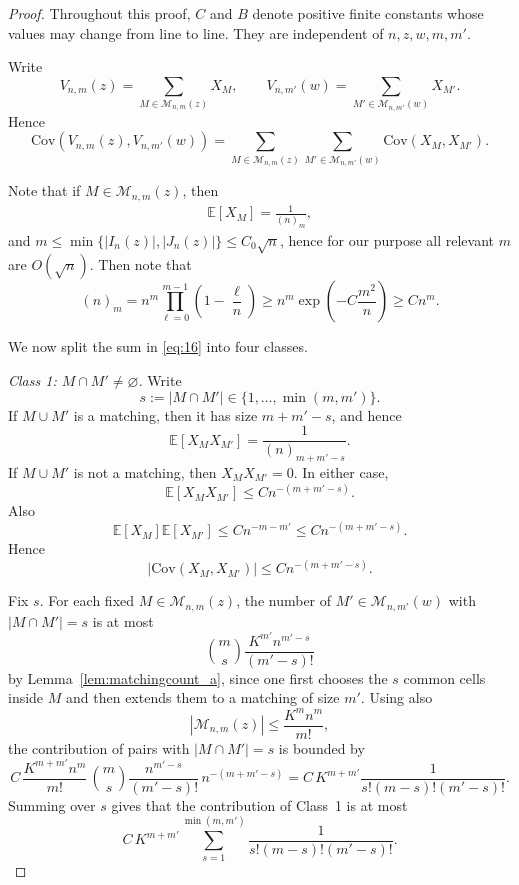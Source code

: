 \documentclass[10pt,a4paper]{amsart}
\newcommand{\abs}[1]{| #1|}
\newcommand{\cov}{\mathrm{Cov}}
\begin{document}
\begin{proof} 
Throughout this proof, $C$ and $B$ denote positive finite constants whose values may change from line to line. They are independent of $n,z,w,m,m'$. 

Write
\[
V_{n,m}(z)=\sum_{M\in\mathcal M_{n,m}(z)} X_M,
\qquad
V_{n,m'}(w)=\sum_{M'\in\mathcal M_{n,m'}(w)} X_{M'}.
\]
Hence
\begin{equation}
\cov(V_{n,m}(z),V_{n,m'}(w))
=
\sum_{M\in\mathcal M_{n,m}(z)}
\sum_{M'\in\mathcal M_{n,m'}(w)}
\cov(X_M,X_{M'}).
\label{eq:16}
\end{equation}


Note that if $M\in \mathcal{M}_{n, m}(z)$, then 
\begin{align*}
    \mathbb{E}[X_M] = \frac{1}{(n)_m},
\end{align*}
and $m \leq \min\{\abs{I_n(z)}, \abs{J_n(z)}\} \leq C_0 \sqrt{n}$, hence for our purpose all relevant $m$ are $O(\sqrt{n})$. Then note that 
\[
(n)_m = n^m\prod_{\ell = 0}^{m - 1}\left(1 - \frac{\ell}{n}\right) \geq n^m\exp(-C\frac{m^2}{n}) \geq C n^m.
\]

We now split the sum in \eqref{eq:16} into four classes.

\smallskip
\noindent
\emph{Class 1: $M\cap M'\neq\varnothing$.}
Write
\[
s:=|M\cap M'|\in\{1,\dots,\min(m,m')\}.
\]
If $M\cup M'$ is a matching, then it has size $m+m'-s$, and hence
\[
\mathbb{E}[X_MX_{M'}]=\frac{1}{(n)_{m+m'-s}}.
\]
If $M\cup M'$ is not a matching, then $X_MX_{M'}=0$. In either case,
\[
\mathbb{E}[X_MX_{M'}]\le C n^{-(m+m'-s)}.
\]
Also
\[
\mathbb{E}[X_M]\mathbb{E}[X_{M'}]\le C n^{-m-m'}
\le C n^{-(m+m'-s)}.
\]
Hence
\[
|\cov(X_M,X_{M'})|\le C n^{-(m+m'-s)}.
\]

Fix $s$. For each fixed $M\in\mathcal M_{n,m}(z)$, the number of
$M'\in\mathcal M_{n,m'}(w)$ with $|M\cap M'|=s$ is at most
\[
\binom{m}{s}\frac{K^{m'} n^{m'-s}}{(m'-s)!}
\]
by Lemma~\ref{lem:matchingcount_a}, since one first chooses the $s$ common cells inside $M$ and then extends them
to a matching of size $m'$.
Using also
\[
|\mathcal M_{n,m}(z)|\le \frac{K^m n^m}{m!},
\]
the contribution of pairs with $|M\cap M'|=s$ is bounded by
\[
C\,
\frac{K^{m+m'} n^m}{m!}\,
\binom{m}{s}\frac{n^{m'-s}}{(m'-s)!}\,
n^{-(m+m'-s)}
=
C\,K^{m+m'}\frac{1}{s!(m-s)!(m'-s)!}.
\]
Summing over $s$ gives that the contribution of Class~1 is at most
\begin{equation}
C\,K^{m+m'}
\sum_{s=1}^{\min(m,m')}
\frac{1}{s!(m-s)!(m'-s)!}.
\end{equation}


\end{proof}
\end{document}
